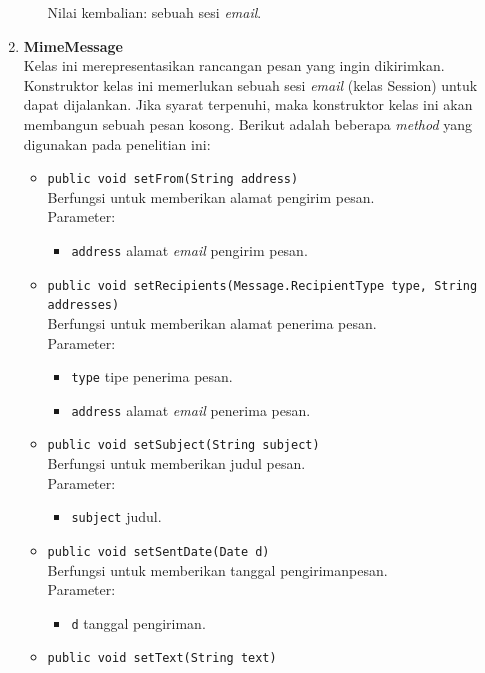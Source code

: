 \begin{enumerate}
\begin{itemize}
\begin{itemize}
				\end{itemize}
			Nilai kembalian: sebuah sesi \textit{email}.
		\end{itemize}
	\item \textbf{MimeMessage}\\
	Kelas ini merepresentasikan rancangan pesan yang ingin dikirimkan. Konstruktor kelas ini memerlukan sebuah sesi \textit{email} (kelas Session) untuk dapat dijalankan. Jika syarat terpenuhi, maka konstruktor kelas ini akan membangun sebuah pesan kosong. Berikut adalah beberapa \textit{method} yang digunakan pada penelitian ini:
		\begin{itemize}
			\item \texttt{public void setFrom(String address)}\\
			Berfungsi untuk memberikan alamat pengirim pesan.\\
			Parameter:
				\begin{itemize}
					\item \texttt{address} alamat \textit{email} pengirim pesan.
				\end{itemize}
			\item \texttt{public void setRecipients(Message.RecipientType type, String addresses)}\\
			Berfungsi untuk memberikan alamat penerima pesan.\\
			Parameter:
				\begin{itemize}
					\item \texttt{type} tipe penerima pesan.
					\item \texttt{address} alamat \textit{email} penerima pesan.
				\end{itemize}
			\item \texttt{public void setSubject(String subject)}\\
			Berfungsi untuk memberikan judul pesan.\\
			Parameter:
				\begin{itemize}
					\item \texttt{subject} judul.
				\end{itemize}
			\item \texttt{public void setSentDate(Date d)}\\
			Berfungsi untuk memberikan tanggal pengirimanpesan.\\
			Parameter:
				\begin{itemize}
					\item \texttt{d} tanggal pengiriman.
				\end{itemize}
			\item \texttt{public void setText(String text)}\\

\end{itemize}
\end{enumerate}
